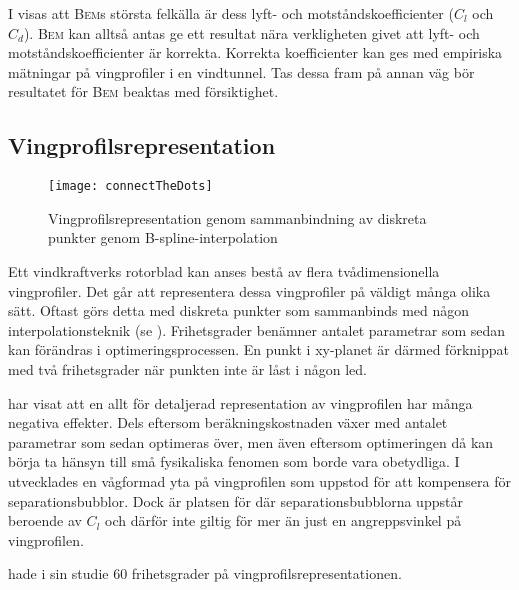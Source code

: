 I \citet{bembraelleranus} visas att \textsc{Bem}s största felkälla är dess lyft- och motståndskoefficienter ($C_l$ och $C_d$). \textsc{Bem} kan alltså antas ge ett resultat nära verkligheten givet att lyft- och motståndskoefficienter är korrekta. Korrekta koefficienter kan ges med empiriska mätningar på vingprofiler i en vindtunnel. Tas dessa fram på annan väg bör resultatet för \textsc{Bem} beaktas med försiktighet.



\begin{comment}
\citet{UnsteadyWind} har visat att uppmätta resultat i vindtunnlar kan vara i underkant mot vad som sedan turbinen behöver klara ute i fält på grund av vindens stötvisa natur. Toppbelastningen visade sig vara högre än vad vindtunnelexperiment tillsammans med \textsc{Bem} förutsade vilket är en underliggande orsak till slitage i mekaniska delar som vindkraftverk dras med. 
\end{comment}






\subsection{Vingprofilsrepresentation}

    \begin{figure}[!h]
      \centering
      \texttt{[image: connectTheDots]}
      \caption{Vingprofilsrepresentation genom sammanbindning av diskreta punkter genom B-spline-interpolation}
      \label{connectTheDots}
    \end{figure}

Ett vindkraftverks rotorblad kan anses bestå av flera tvådimensionella vingprofiler. Det går att representera dessa vingprofiler på väldigt många olika sätt. Oftast görs detta med diskreta punkter som sammanbinds med någon interpolationsteknik (se ). Frihetsgrader benämner antalet parametrar som sedan kan förändras i optimeringsprocessen. En punkt i xy-planet är därmed förknippat med två frihetsgrader när punkten inte är låst i någon led. 


\citet{DrelaTrubbel} har visat att en allt för detaljerad representation av vingprofilen har många negativa effekter. Dels eftersom beräkningskostnaden växer med antalet parametrar som sedan optimeras över, men även eftersom optimeringen då kan börja ta hänsyn till små fysikaliska fenomen som borde vara obetydliga. I \citet{DrelaTrubbel}  utvecklades en vågformad yta på vingprofilen som uppstod för att kompensera för separationsbubblor. Dock är platsen för där separationsbubblorna uppstår beroende av $C_l$ och därför inte giltig för mer än just en angreppsvinkel på vingprofilen. \begin{comment}\hl{En vingprofil som inte är mjuk är ur tillverkningssynpunkt inte heller lämplig}.\end{comment} \citet{DrelaTrubbel} hade i sin studie 60 frihetsgrader på vingprofilsrepresentationen.

